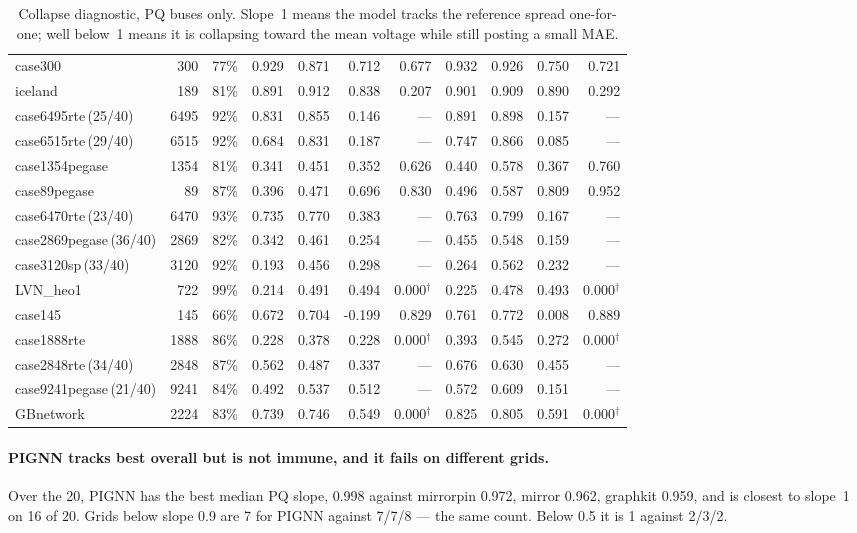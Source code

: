 \documentclass[10pt]{article}
\begin{document}
\begin{landscape}
\begin{table}[H]
\begin{tabular}{lrr rrrr rrrr}
case300 & 300 & 77\% & 0.929 & 0.871 & 0.712 & 0.677 & 0.932 & 0.926 & 0.750 & 0.721 \\
iceland & 189 & 81\% & 0.891 & 0.912 & 0.838 & 0.207 & 0.901 & 0.909 & 0.890 & 0.292 \\
case6495rte\,(25/40) & 6495 & 92\% & 0.831 & 0.855 & 0.146 & --- & 0.891 & 0.898 & 0.157 & --- \\
case6515rte\,(29/40) & 6515 & 92\% & 0.684 & 0.831 & 0.187 & --- & 0.747 & 0.866 & 0.085 & --- \\
case1354pegase & 1354 & 81\% & 0.341 & 0.451 & 0.352 & 0.626 & 0.440 & 0.578 & 0.367 & 0.760 \\
case89pegase & 89 & 87\% & 0.396 & 0.471 & 0.696 & 0.830 & 0.496 & 0.587 & 0.809 & 0.952 \\
case6470rte\,(23/40) & 6470 & 93\% & 0.735 & 0.770 & 0.383 & --- & 0.763 & 0.799 & 0.167 & --- \\
case2869pegase\,(36/40) & 2869 & 82\% & 0.342 & 0.461 & 0.254 & --- & 0.455 & 0.548 & 0.159 & --- \\
case3120sp\,(33/40) & 3120 & 92\% & 0.193 & 0.456 & 0.298 & --- & 0.264 & 0.562 & 0.232 & --- \\
LVN\_heo1 & 722 & 99\% & 0.214 & 0.491 & 0.494 & 0.000$^\dagger$ & 0.225 & 0.478 & 0.493 & 0.000$^\dagger$ \\
case145 & 145 & 66\% & 0.672 & 0.704 & -0.199 & 0.829 & 0.761 & 0.772 & 0.008 & 0.889 \\
case1888rte & 1888 & 86\% & 0.228 & 0.378 & 0.228 & 0.000$^\dagger$ & 0.393 & 0.545 & 0.272 & 0.000$^\dagger$ \\
case2848rte\,(34/40) & 2848 & 87\% & 0.562 & 0.487 & 0.337 & --- & 0.676 & 0.630 & 0.455 & --- \\
case9241pegase\,(21/40) & 9241 & 84\% & 0.492 & 0.537 & 0.512 & --- & 0.572 & 0.609 & 0.151 & --- \\
GBnetwork & 2224 & 83\% & 0.739 & 0.746 & 0.549 & 0.000$^\dagger$ & 0.825 & 0.805 & 0.591 & 0.000$^\dagger$ \\
\bottomrule
\end{tabular}
\caption{Collapse diagnostic, PQ buses only. Slope~1 means the model tracks the reference spread one-for-one; well below~1 means it is collapsing toward the mean voltage while still posting a small MAE.}
\end{table}
\end{landscape}

\paragraph{PIGNN tracks best overall but is not immune, and it fails on
different grids.} Over the 20, PIGNN has the best median PQ slope, 0.998 against
mirrorpin 0.972, mirror 0.962, graphkit 0.959, and is closest to slope~1 on 16
of 20. Grids below slope 0.9 are 7 for PIGNN against 7/7/8 --- the same count.
Below 0.5 it is 1 against 2/3/2.
\end{document}
